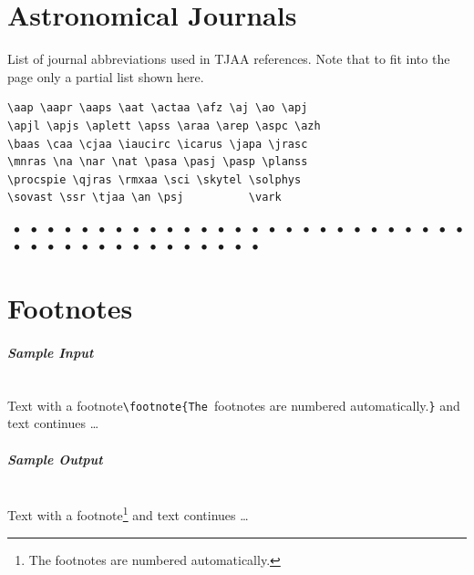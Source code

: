 \documentclass[usenatbib]{tjaa}
\begin{document}
\section{Astronomical Journals}

List of journal abbreviations used in TJAA references. Note that to fit into
the page only a partial list shown here.
\begin{verbatim}
\aap \aapr \aaps \aat \actaa \afz \aj \ao \apj
\apjl \apjs \aplett \apss \araa \arep \aspc \azh
\baas \caa \cjaa \iaucirc \icarus \japa \jrasc
\mnras \na \nar \nat \pasa \pasj \pasp \planss
\procspie \qjras \rmxaa \sci \skytel \solphys
\sovast \ssr \tjaa \an \psj          \vark
\end{verbatim}
\begin{footnotesize}
\aap		~$\bullet$
\aapr		~$\bullet$
\aaps		~$\bullet$
\aat		~$\bullet$
\actaa		~$\bullet$
\afz		~$\bullet$
\aj		~$\bullet$
\ao 		~$\bullet$
\apj		~$\bullet$
\apjl		~$\bullet$
\apjs		~$\bullet$
\aplett		~$\bullet$
\apss		~$\bullet$
\araa		~$\bullet$
\arep		~$\bullet$
\aspc		~$\bullet$
\azh		~$\bullet$
\baas		~$\bullet$
\caa		~$\bullet$
\cjaa		~$\bullet$
\iaucirc	~$\bullet$
\icarus		~$\bullet$
\japa		~$\bullet$
\jrasc		~$\bullet$
\mnras		~$\bullet$
\na		~$\bullet$
\nar		~$\bullet$
\nat		~$\bullet$
\pasa		~$\bullet$
\pasj		~$\bullet$
\pasp		~$\bullet$
\planss		~$\bullet$
\procspie	~$\bullet$
\qjras		~$\bullet$
\rmxaa		~$\bullet$
\sci		~$\bullet$
\skytel		~$\bullet$
\solphys	~$\bullet$
\sovast		~$\bullet$
\ssr		~$\bullet$
\an		~$\bullet$
\psj		~$\bullet$
\tjaa\\\vark
\end{footnotesize}

\section{Footnotes}

\paragraph*{\itshape Sample Input}~\\
Text with a footnote\verb|\footnote{The |{footnotes are numbered automatically.}\verb|}| and text continues \dots

\paragraph*{\itshape Sample Output}~\\
Text with a footnote\footnote{The footnotes are numbered automatically.}
and text continues \dots
\end{document}
